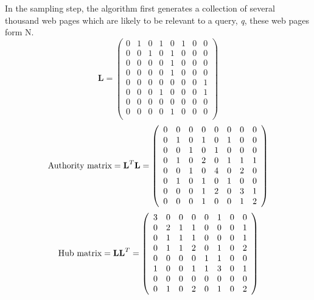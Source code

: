 \documentclass[11pt]{report}
\begin{document}
In the sampling step, the algorithm first generates a collection of several thousand web pages which are likely to be relevant to a query, \textit{q}, these web pages form N. 
\begin{equation}
\textbf{L}=\left(
\begin{array}{cccccccc}
0 & 1 & 0 & 1 & 0 & 1 & 0 & 0 \\
0 & 0 & 1 & 0 & 1 & 0 & 0 & 0 \\
0 & 0 & 0 & 0 & 1 & 0 & 0 & 0 \\
0 & 0 & 0 & 0 & 1 & 0 & 0 & 0 \\
0 & 0 & 0 & 0 & 0 & 0 & 0 & 1 \\
0 & 0 & 0 & 1 & 0 & 0 & 0 & 1 \\
0 & 0 & 0 & 0 & 0 & 0 & 0 & 0 \\
0 & 0 & 0 & 0 & 1 & 0 & 0 & 0 \\
\end{array}
\right)
\end{equation}
\begin{equation}
\textnormal{Authority matrix} = \textbf{L}^T\textbf{L}=\left(
\begin{array}{cccccccc}
0 & 0 & 0 & 0 & 0 & 0 & 0 & 0 \\
0 & 1 & 0 & 1 & 0 & 1 & 0 & 0 \\
0 & 0 & 1 & 0 & 1 & 0 & 0 & 0 \\
0 & 1 & 0 & 2 & 0 & 1 & 1 & 1 \\
0 & 0 & 1 & 0 & 4 & 0 & 2 & 0 \\
0 & 1 & 0 & 1 & 0 & 1 & 0 & 0 \\
0 & 0 & 0 & 1 & 2 & 0 & 3 & 1 \\
0 & 0 & 0 & 1 & 0 & 0 & 1 & 2 \\
\end{array}
\right)
\end{equation}
\begin{equation}
\textnormal{Hub matrix} = \textbf{LL}^T=\left(
\begin{array}{cccccccc}
3 & 0 & 0 & 0 & 0 & 1 & 0 & 0 \\
0 & 2 & 1 & 1 & 0 & 0 & 0 & 1 \\
0 & 1 & 1 & 1 & 0 & 0 & 0 & 1 \\
0 & 1 & 1 & 2 & 0 & 1 & 0 & 2 \\
0 & 0 & 0 & 0 & 1 & 1 & 0 & 0 \\
1 & 0 & 0 & 1 & 1 & 3 & 0 & 1 \\
0 & 0 & 0 & 0 & 0 & 0 & 0 & 0 \\
0 & 1 & 0 & 2 & 0 & 1 & 0 & 2 \\
\end{array}
\right)
\end{equation}
\end{document}

